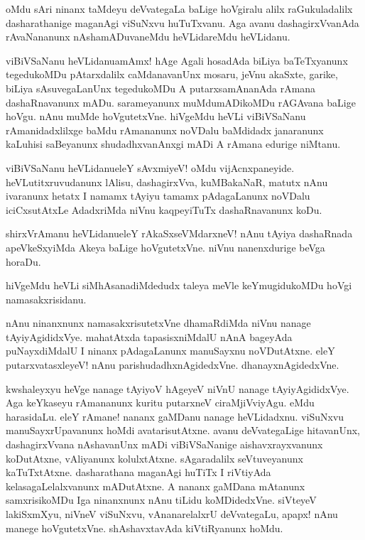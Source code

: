 \begin{mng}
oMdu sAri ninanx taMdeyu deVvategaLa baLige hoVgiralu alilx raGukuladalilx dasharathanige maganAgi viSuNxvu huTuTxvanu. Aga avanu dashagirxVvanAda rAvaNananunx nAshamADuvaneMdu heVLidareMdu heVLidanu.
\end{mng}

\begin{mng}
viBiVSaNanu heVLidanu\mdash amAmx! hAge Agali hosadAda biLiya baTeTxyanunx tegedukoMDu pAtarxdalilx caMdanavanUnx mosaru, jeVnu akaSxte, garike, biLiya sAsuvegaLanUnx tegedukoMDu A putarxsamAnanAda rAmana dashaRnavanunx mADu. sarameyanunx muMdumADikoMDu rAGAvana baLige hoVgu. nAnu muMde hoVgutetxVne. hiVgeMdu heVLi viBiVSaNanu rAmanidadxlilxge baMdu rAmananunx noVDalu baMdidadx janaranunx kaLuhisi saBeyanunx shudadhxvanAnxgi mADi A rAmana edurige niMtanu.
\end{mng}

\begin{mng}
viBiVSaNanu heVLidanu\mdash eleY sAvxmiyeV! oMdu vijAcnxpaneyide. heVLutitxruvudanunx lAlisu, dashagirxVva, kuMBakaNaR, matutx nAnu ivaranunx hetatx I namamx tAyiyu tamamx pAdagaLanunx noVDalu iciCxsutAtxLe AdadxriMda niVnu kaqpeyiTuTx dashaRnavanunx koDu. 
\end{mng}

\begin{mng}
shirxVrAmanu heVLidanu\mdash eleY rAkaSxseVMdarxneV! nAnu tAyiya dashaRnada apeVkeSxyiMda Akeya baLige hoVgutetxVne. niVnu nanenxdurige beVga horaDu.
\end{mng}

\begin{mng}
hiVgeMdu heVLi siMhAsanadiMdedudx taleya meVle keYmugidukoMDu hoVgi namasakxrisidanu.
\end{mng}

\begin{mng}
nAnu ninanxnunx namasakxrisutetxVne dhamaRdiMda niVnu nanage tAyiyAgididxVye. mahatAtxda tapasisxniMdalU nAnA bageyAda puNayxdiMdalU I ninanx pAdagaLanunx manuSayxnu noVDutAtxne. eleY putarxvatasxleyeV! nAnu parishudadhxnAgidedxVne. dhanayxnAgidedxVne.
\end{mng}

\begin{mng}
kwshaleyxyu heVge nanage tAyiyoV hAgeyeV niVnU nanage tAyiyAgididxVye. Aga keYkaseyu rAmananunx kuritu putarxneV ciraMjiVviyAgu. eMdu harasidaLu. eleY rAmane! nananx gaMDanu nanage heVLidadxnu. viSuNxvu manuSayxrUpavanunx hoMdi avatarisutAtxne. avanu deVvategaLige hitavanUnx, dashagirxVvana nAshavanUnx mADi viBiVSaNanige aishavxrayxvanunx koDutAtxne, vAliyanunx kolulxtAtxne. sAgaradalilx seVtuveyanunx kaTuTxtAtxne. dasharathana maganAgi huTiTx I riVtiyAda kelasagaLelalxvanunx mADutAtxne. A nananx gaMDana mAtanunx samxrisikoMDu Iga ninanxnunx nAnu tiLidu koMDidedxVne. siVteyeV lakiSxmXyu, niVneV viSuNxvu, vAnanarelalxrU deVvategaLu, apapx! nAnu manege hoVgutetxVne. shAshavxtavAda kiVtiRyanunx hoMdu.
\end{mng}

